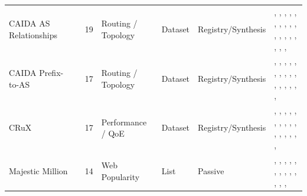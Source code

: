 \documentclass[11pt,a4paper]{article}
\begin{document}
\begin{longtable}{@{}p{}p{}p{}p{}p{}p{}p{}@{}}
CAIDA AS Relationships & \cite{asrelationships} & 19 & Routing / Topology & Dataset & Registry/Synthesis & \cite{10.1145/3646547.3689010}, \cite{10.1145/3618257.3624838}, \cite{10.1145/3618257.3624812}, \cite{10.1145/3517745.3561419}, \cite{10.1007/978-3-030-72582-2_14}, \cite{10.1007/978-3-030-98785-5_10}, \cite{10.1007/978-3-030-98785-5_14}, \cite{10.1007/978-3-030-98785-5_15}, \cite{10.1007/978-3-030-98785-5_20}, \cite{10.1007/978-3-030-98785-5_29}, \cite{10.1007/978-3-031-56252-5_4}, \cite{10.1007/978-3-031-85960-1_14}, \cite{10.1145/3777912.3839834}, \cite{10.1145/3777912.3839831}, \cite{10.1007/978-3-032-18268-5_5}, \cite{10.1145/3777912.3839828}, \cite{10.1145/3777912.3809144}, \cite{10.1145/3777912.3839812}, \cite{10.1145/3777912.3809137} \\
CAIDA Prefix-to-AS & \cite{caidapfx2as} & 17 & Routing / Topology & Dataset & Registry/Synthesis & \cite{10.1145/3618257.3624831}, \cite{10.1145/3517745.3561458}, \cite{10.1145/3517745.3561419}, \cite{10.1145/3517745.3561425}, \cite{10.1145/3487552.3487822}, \cite{10.1145/3487552.3487862}, \cite{10.1145/3487552.3487820}, \cite{10.1007/978-3-030-72582-2_32}, \cite{10.1007/978-3-030-98785-5_14}, \cite{10.1007/978-3-030-98785-5_15}, \cite{10.1007/978-3-030-98785-5_29}, \cite{10.1007/978-3-031-28486-1_10}, \cite{10.1145/3777912.3839834}, \cite{10.1145/3777912.3839831}, \cite{10.1007/978-3-032-18268-5_4}, \cite{10.1145/3777912.3839791}, \cite{10.1145/3777912.3839828} \\
CRuX & \cite{crux} & 17 & Performance / QoE & Dataset & Registry/Synthesis & \cite{10.1145/3730567.3764439}, \cite{10.1145/3730567.3764489}, \cite{10.1145/3730567.3764505}, \cite{10.1145/3618257.3624836}, \cite{10.1145/3618257.3624821}, \cite{10.1145/3618257.3624846}, \cite{10.1145/3517745.3561444}, \cite{10.1007/978-3-030-72582-2_5}, \cite{10.1007/978-3-031-28486-1_25}, \cite{10.1145/3777912.3839832}, \cite{10.1007/978-3-032-18268-5_1}, \cite{10.1007/978-3-032-18268-5_4}, \cite{10.1145/3777912.3839788}, \cite{10.1145/3777912.3839809}, \cite{10.1145/3777912.3839794}, \cite{10.1145/3777912.3839828}, \cite{10.1145/3777912.3839792} \\
Majestic Million & \cite{majesticmillion} & 14 & Web Popularity & List & Passive & \cite{10.1145/3730567.3764501}, \cite{10.1145/3646547.3688449}, \cite{10.1145/3618257.3624844}, \cite{10.1145/3618257.3624821}, \cite{10.1145/3517745.3561440}, \cite{10.1145/3517745.3561444}, \cite{10.1145/3487552.3487826}, \cite{10.1007/978-3-030-98785-5_22}, \cite{10.1007/978-3-031-56249-5_12}, \cite{10.1007/978-3-031-85960-1_3}, \cite{10.1007/978-3-031-85960-1_5}, \cite{10.1007/978-3-032-18268-5_1}, \cite{10.1145/3777912.3839801}, \cite{10.1145/3777912.3839807} \\

\end{longtable}
\end{document}
